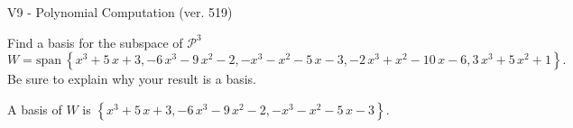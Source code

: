 \begin{exercise}
  \begin{exerciseTitle}V9 - Polynomial Computation (ver. 519)\end{exerciseTitle}
  \begin{exerciseStatement}
    Find a basis for the subspace of \(\mathcal{P}^3\) 
\[W=\mathrm{span}\ \left\{x^{3} + 5 \, x + 3 , -6 \, x^{3} - 9 \, x^{2} - 2 , -x^{3} - x^{2} - 5 \, x - 3 , -2 \, x^{3} + x^{2} - 10 \, x - 6 , 3 \, x^{3} + 5 \, x^{2} + 1\right\}.\]
 Be sure to explain why your result is a basis.


  \end{exerciseStatement}
  \begin{exerciseAnswer}
   A basis of \(W\) is  \(\left\{x^{3} + 5 \, x + 3 , -6 \, x^{3} - 9 \, x^{2} - 2 , -x^{3} - x^{2} - 5 \, x - 3\right\}\).
  


  \end{exerciseAnswer}
\end{exercise}